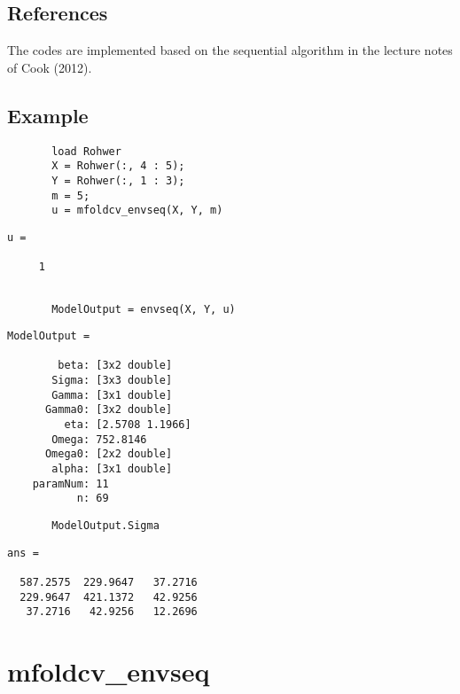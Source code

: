 \documentclass[a4paper,11pt,openany]{memoir}
\begin{document}
\subsection*{References}

\begin{par}
The codes are implemented based on the sequential algorithm in the lecture notes of Cook (2012).
\end{par} \vspace{1em}

\subsection*{Example}


\begin{verbatim}       load Rohwer
       X = Rohwer(:, 4 : 5);
       Y = Rohwer(:, 1 : 3);
       m = 5;
       u = mfoldcv_envseq(X, Y, m)\end{verbatim}
    
        \color{lightgray}\ttfamily \begin{verbatim}
u =

     1
\end{verbatim}\rmfamily 
\color{black}
\begin{verbatim}

       ModelOutput = envseq(X, Y, u)
\end{verbatim}
        \color{lightgray}\ttfamily \begin{verbatim}
ModelOutput = 

        beta: [3x2 double]
       Sigma: [3x3 double]
       Gamma: [3x1 double]
      Gamma0: [3x2 double]
         eta: [2.5708 1.1966]
       Omega: 752.8146
      Omega0: [2x2 double]
       alpha: [3x1 double]
    paramNum: 11
           n: 69
\end{verbatim}\rmfamily 
\color{black}

\begin{verbatim}
       ModelOutput.Sigma\end{verbatim}
        \color{lightgray}\ttfamily \begin{verbatim}       
ans =

  587.2575  229.9647   37.2716
  229.9647  421.1372   42.9256
   37.2716   42.9256   12.2696

\end{verbatim} \rmfamily\color{black}
       
\newpage
\rmfamily
\color{black}\section{mfoldcv\_envseq}
\end{document}
